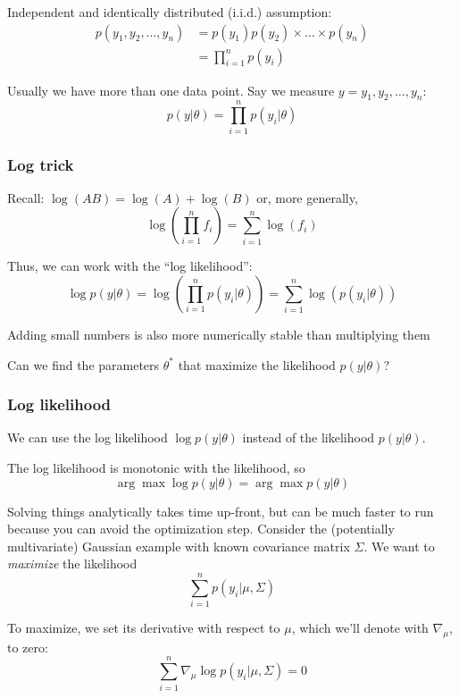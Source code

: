 \documentclass[
  letterpaper,
  DIV=11,
  numbers=noendperiod]{scrreprt}
\begin{document}
Independent and identically distributed (i.i.d.) assumption: \[
\begin{aligned}
p(y_1, y_2, \ldots, y_n) &= p(y_1) p(y_2) \times \ldots \times p(y_n)\\
 &= \prod_{i=1}^n p(y_i)
\end{aligned}
\]

Usually we have more than one data point. Say we measure
\(y = y_1, y_2, \ldots, y_n\): \[
p(y | \theta) = \prod_{i=1}^n p(y_i | \theta)
\]

\subsubsection{Log trick}\label{log-trick}

Recall: \(\log(AB) = \log(A) + \log(B)\) or, more generally, \[
\log \left( \prod_{i=1}^n f_i \right) = \sum_{i=1}^n \log(f_i)
\]

Thus, we can work with the ``log likelihood'': \[
\log p(y | \theta) =  \log \left( \prod_{i=1}^n p(y_i | \theta) \right) = \sum_{i=1}^n \log \left( p(y_i | \theta) \right)
\]

Adding small numbers is also more numerically stable than multiplying
them

Can we find the parameters \(\theta^*\) that maximize the likelihood
\(p(y | \theta)\)?

\subsubsection{Log likelihood}\label{log-likelihood}

We can use the log likelihood \(\log p(y | \theta)\) instead of the
likelihood \(p(y | \theta)\).

The log likelihood is monotonic with the likelihood, so \[
\arg \max \log p(y | \theta) = \arg \max p(y | \theta)
\]

Solving things analytically takes time up-front, but can be much faster
to run because you can avoid the optimization step. Consider the
(potentially multivariate) Gaussian example with known covariance matrix
\(\Sigma\). We want to \emph{maximize} the likelihood \[
\sum_{i=1}^n p(y_i | \mu, \Sigma)
\]

To maximize, we set its derivative with respect to \(\mu\), which we'll
denote with \(\nabla_\mu\), to zero: \[
\sum_{i=1}^n \nabla_\mu \log p(y_i | \mu, \Sigma) = 0
\]
\end{document}
